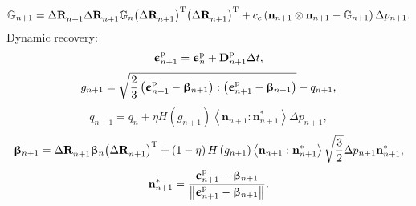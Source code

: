\begin{equation}
{\mathbb{G}_{n + 1}} = \Delta {\mathbf{R}}_{n + 1}^{} \Delta {\mathbf{R}}_{n + 1}^{} {\mathbb{G}_{n}} {\left( {\Delta {\mathbf{R}}_{n + 1}^{}} \right)^{\rm{T}}} {\left( {\Delta {\mathbf{R}}_{n + 1}^{}} \right)^{\rm{T}}} + {c_c}\left( {{{\mathbf{n}}_{n + 1}} \otimes {{\mathbf{n}}_{n + 1}} - {\mathbb{G}_{n + 1}}} \right)\Delta {p_{n + 1}}.
\end{equation}
Dynamic recovery:
\begin{equation}
{\bm{\upepsilon }}_{n + 1}^{\rm p} = {\bm{\upepsilon }}_{n}^{\rm p} + {\mathbf{D}}_{n + 1}^{\rm p}\Delta t,
\end{equation}
\begin{equation}
{g_{n + 1}} = \sqrt {\frac{2}{3}\left( { {\bm{\upepsilon }}_{n + 1}^{\rm p} - {{\bm{\upbeta }}_{n + 1}}} \right):\left( { {\bm{\upepsilon }}_{n + 1}^{\rm p} - {{\bm{\upbeta }}_{n + 1}}} \right)}  - {q_{n + 1}},
\end{equation}
\begin{equation}
{q_{n + 1}} = {q_{n}} + \eta H\left( {{g_{n + 1}}} \right)\left\langle {{{\mathbf{n}}_{n + 1}}:{\mathbf{n}}_{n + 1}^*} \right\rangle \Delta {p_{n + 1}},
\end{equation}
\begin{equation}
{{\bm{\upbeta }}_{n + 1}} = \Delta {\mathbf{R}}_{n + 1}^{}{{\bm{\upbeta }}_n}{\left( {\Delta {\mathbf{R}}_{n + 1}^{}} \right)^{\rm{T}}} +
\left( {1 - \eta } \right)H\left( {{g_{n + 1}}} \right)\left\langle {{{\mathbf{n}}_{n + 1}}:{\mathbf{n}}_{n + 1}^*} \right\rangle \sqrt {\frac{3}{2}} \Delta {p_{n + 1}}{\mathbf{n}}_{n + 1}^*,
\end{equation}
\begin{equation}
{\mathbf{n}}_{n + 1}^* = \frac{{{\bm{\upepsilon }}_{n + 1}^{\rm p} - {{\bm{\upbeta }}_{n + 1}}}}{{\left\| {{\bm{\upepsilon }}_{n + 1}^{\rm p} - {{\bm{\upbeta }}_{n + 1}}} \right\|}}.
\end{equation}


